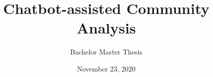 \newcommand*{\BACHELOR}{}
\title{Chatbot-assisted Community Analysis}
\subtitle{\ifdefined\BACHELOR Bachelor \else Master \fi Thesis \ifdefined\PROPOSAL
		\PROPOSAL
	\fi}
\date{November 23, 2020}
\newcommand{\firstname}{Ben Aziz}
\newcommand{\lastname}{Lakhoune}
\newcommand{\matrNo}{380163}
\newcommand{\email}{ben.lakhoune@rwth-aachen.de}
\newcommand{\studyProgram}{\ifdefined\BACHELOR Bachelor \else Master \fi Computer Science}

\newcommand{\firstsupervisor}{PD Dr. Ralf Klamma}
\newcommand{\firstsupervisorchair}{Chair of Information Systems}
\newcommand{\firstsupervisoruniversity}{RWTH Aachen University}

\newcommand{\secondsupervisor}{Prof. Dr. Matthias Jarke}
\newcommand{\secondsupervisorchair}{Chair of Information Systems}
\newcommand{\secondsupervisoruniversity}{RWTH Aachen University}


\newcommand{\firstadvisor}{Alexander Neumann}
\newcommand{\firstadvisorchair}{Chair of Information Systems}
\newcommand{\firstadvisoruniversity}{RWTH Aachen University}

